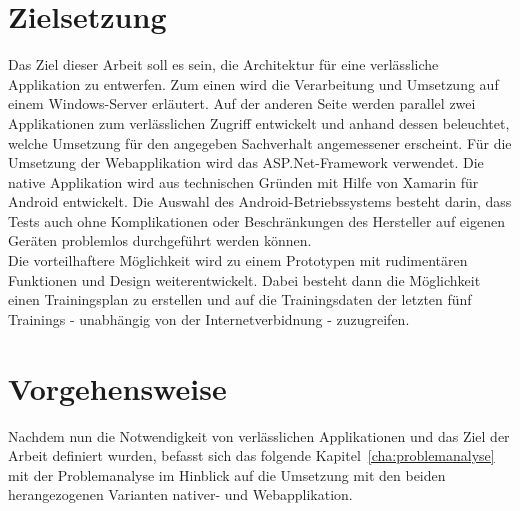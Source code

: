 \section{Zielsetzung}
\label{sec:zielsetzung}
Das Ziel dieser Arbeit soll es sein, die Architektur für eine verlässliche Applikation zu entwerfen. Zum einen wird die Verarbeitung und Umsetzung auf einem Windows-Server erläutert. Auf der anderen Seite werden parallel zwei Applikationen zum verlässlichen Zugriff entwickelt und anhand dessen beleuchtet, welche Umsetzung für den angegeben Sachverhalt angemessener erscheint. Für die Umsetzung der Webapplikation wird das ASP.Net-Framework verwendet. Die native Applikation wird aus technischen Gründen mit Hilfe von Xamarin für Android entwickelt. Die Auswahl des Android-Betriebssystems besteht darin, dass Tests auch ohne Komplikationen oder Beschränkungen des Hersteller auf eigenen Geräten problemlos durchgeführt werden können.\\
Die vorteilhaftere Möglichkeit wird zu einem Prototypen mit rudimentären Funktionen und Design weiterentwickelt. Dabei besteht dann die Möglichkeit einen Trainingsplan zu erstellen und auf die Trainingsdaten der letzten fünf Trainings - unabhängig von der Internetverbidnung - zuzugreifen.



\section{Vorgehensweise}
\label{sec:vorgehensweise}
Nachdem nun die Notwendigkeit von verlässlichen Applikationen und das Ziel der Arbeit definiert wurden, befasst sich das folgende Kapitel~\ref{cha:problemanalyse} mit der Problemanalyse im Hinblick auf die Umsetzung mit den beiden herangezogenen Varianten nativer- und Webapplikation.









